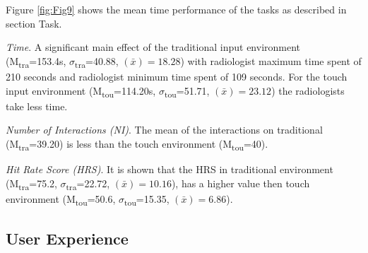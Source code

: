 \documentclass{chi-ext}
\begin{document}

Figure \ref{fig:Fig9} shows the mean time performance of the tasks as described in section Task.

\textit{Time}. A significant main effect of the traditional input environment (M\textsubscript{tra}=153.4s, $\sigma$\textsubscript{tra}=40.88, {}$\left({\bar x}\right)=18.28$) with radiologist maximum time spent of 210 seconds and radiologist minimum time spent of 109 seconds. For the touch input environment (M\textsubscript{tou}=114.20s, $\sigma$\textsubscript{tou}=51.71, {}$\left({\bar x}\right)=23.12$) the radiologists take less time.
  
\textit{Number of Interactions (NI)}. The mean of the interactions on traditional (M\textsubscript{tra}=39.20) is less than the touch environment (M\textsubscript{tou}=40).

\textit{Hit Rate Score (HRS)}. It is shown that the HRS in traditional environment (M\textsubscript{tra}=75.2, $\sigma$\textsubscript{tra}=22.72, {}$\left({\bar x}\right)=10.16$), has a higher value then touch environment (M\textsubscript{tou}=50.6, $\sigma$\textsubscript{tou}=15.35, {}$\left({\bar x}\right)=6.86$).

\subsection{User Experience}
\end{document}
